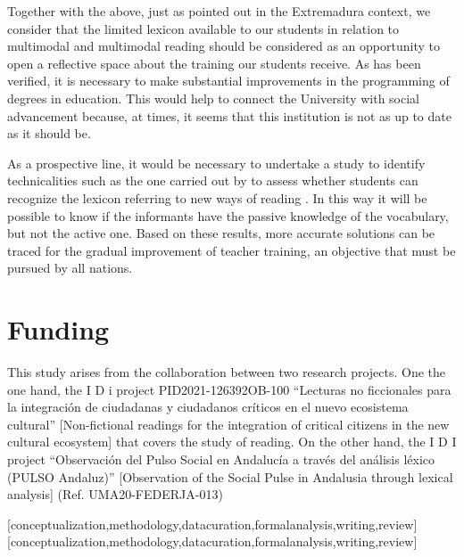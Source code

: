 \documentclass[english]{textolivre}
\begin{document}
Together with the above, just as \textcite{de_la_maya_retamar_disponibilidad_2020} pointed out in the Extremadura context, we consider that the limited lexicon available to our students in relation to multimodal and multimodal reading should be considered as an opportunity to open a reflective space about the training our students receive. As has been verified, it is necessary to make substantial improvements in the programming of degrees in education. This would help to connect the University with social advancement because, at times, it seems that this institution is not as up to date as it should be.

As a prospective line, it would be necessary to undertake a study to identify technicalities such as the one carried out by \textcite{santos_diaz_activacion_2020} to assess whether students can recognize the lexicon referring to new ways of reading \cite{amiama-espaillat_lectura_2017,cordon_garcia_socializacion_2023,diaz_diaz_lectura_2022a,diaz-diaz_lector_2022b}. In this way it will be possible to know if the informants have the passive knowledge of the vocabulary, but not the active one. Based on these results, more accurate solutions can be traced for the gradual improvement of teacher training, an objective that must be pursued by all nations.

\section{Funding}
This study arises from the collaboration between two research projects. One the one hand, the I D i project PID2021-126392OB-100 “Lecturas no ficcionales para la integración de ciudadanas y ciudadanos críticos en el nuevo ecosistema cultural” [Non-fictional readings for the integration of critical citizens in the new cultural ecosystem] that covers the study of reading. On the other hand, the I D I project “Observación del Pulso Social en Andalucía a través del análisis léxico (PULSO Andaluz)” [Observation of the Social Pulse in Andalusia through lexical analysis] (Ref. UMA20-FEDERJA-013) 

\printbibliography\label{sec-bib}


\begin{contributors}
[conceptualization,methodology,datacuration,formalanalysis,writing,review]
[conceptualization,methodology,datacuration,formalanalysis,writing,review]
\end{contributors}
\end{document}
